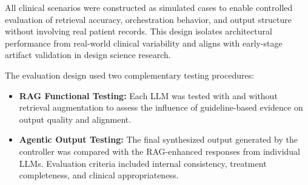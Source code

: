 \documentclass[preprint,12pt]{elsarticle}
\begin{document}
All clinical scenarios were constructed as simulated cases to enable controlled evaluation of retrieval accuracy, orchestration behavior, and output structure without involving real patient records. This design isolates architectural performance from real-world clinical variability and aligns with early-stage artifact validation in design science research.

The evaluation design used two complementary testing procedures:

\begin{itemize}
    \item \textbf{RAG Functional Testing:} Each LLM was tested with and without retrieval augmentation to assess the influence of guideline-based evidence on output quality and alignment.
    
    \item \textbf{Agentic Output Testing:} The final synthesized output generated by the controller was compared with the RAG-enhanced responses from individual LLMs. Evaluation criteria included internal consistency, treatment completeness, and clinical appropriateness.
\end{itemize}
\end{document}

